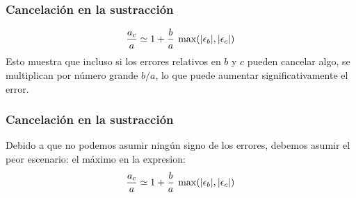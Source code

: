 \begin{frame}
\frametitle{Cancelación en la sustracción}
\begin{align*}
\dfrac{a_{c}}{a} \simeq 1 + \dfrac{b}{a} \: \max(\abs{\epsilon_{b}}, \abs{\epsilon_{c}})
\end{align*}
Esto muestra que incluso si los errores relativos en $b$ y $c$ pueden cancelar algo, se multiplican por número grande $b / a$, lo que puede aumentar significativamente el error.
\end{frame}
\begin{frame}
\frametitle{Cancelación en la sustracción}
Debido a que no podemos asumir ningún signo de los errores, debemos asumir el peor escenario: el máximo en la expresion:
\begin{align*}
\dfrac{a_{c}}{a} \simeq 1 + \dfrac{b}{a} \: \max(\abs{\epsilon_{b}}, \abs{\epsilon_{c}})
\end{align*}
\end{frame}
